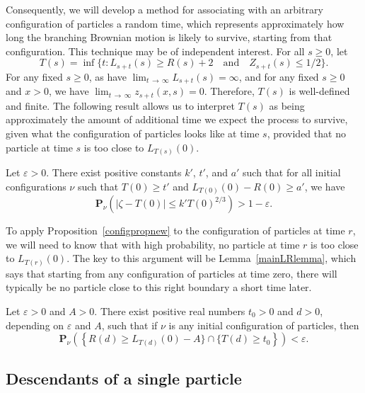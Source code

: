 \documentclass[AHL,Unicode,longabstracts,published]{cedram}
\newcommand*\eps{\varepsilon}
\renewcommand*\P{\mathbf{P}}
\newcommand{\1} {\mathds{1}}
\begin{document}
Consequently, we will develop a method for associating with an arbitrary configuration of particles a random time, which represents approximately how long the branching Brownian motion is likely to survive, starting from that configuration. This technique may be of independent interest. For all $s \geq 0$, let
\begin{equation}\label{Tdef}
T(s) = \inf\big\{t: L_{s+t}(s) \geq R(s) + 2 \quad\text{and}\quad Z_{s+t}(s) \leq 1/2\big\}.
\end{equation}
For any fixed $s \geq 0$, as have $\lim_{t\,\rightarrow \,\infty} L_{s+t}(s) = \infty$, and for any fixed $s \geq 0$ and $x > 0$, we have $\lim_{t\,\rightarrow \,\infty} z_{s+t}(x,s) = 0$. Therefore, $T(s)$ is well-defined and finite. The following result allows us to interpret $T(s)$ as being approximately the amount of additional time we expect the process to survive, given what the configuration of particles looks like at time $s$, provided that no particle at time $s$ is too close to $L_{T(s)}(0)$.

\begin{lemm}\label{tightextinct}
Let $\eps > 0$. There exist positive constants $k'$, $t'$, and $a'$ such that for all initial configurations $\nu$ such that $T(0) \geq t'$ and $L_{T(0)}(0) - R(0) \geq a'$, we have
\[
\P_{\nu}\left(\left|\zeta - T(0)\right| \leq k' T(0)^{2/3}\right) > 1 - \eps.
\]
\end{lemm}

To apply Proposition~\ref{configpropnew} to the configuration of particles at time $r$, we will need to know that with high probability, no particle at time $r$ is too close to $L_{T(r)}(0)$. The key to this argument will be Lemma~\ref{mainLRlemma}, which says that starting from any configuration of particles at time zero, there will typically be no particle close to this right boundary a short time later.

\begin{lemm}\label{mainLRlemma}
Let $\eps > 0$ and $A > 0$. There exist positive real numbers $t_0 > 0$ and $d > 0$, depending on $\eps$ and $A$, such that if $\nu$ is any initial configuration of particles, then
\[
\P_{\nu}\left(\left\{R(d) \geq L_{T(d)}(0) - A\} \cap \{T(d) \geq t_0\right\}\right) < \eps.
\]
\end{lemm}

\subsection{Descendants of a single particle}\label{sec:descendants}
\end{document}
